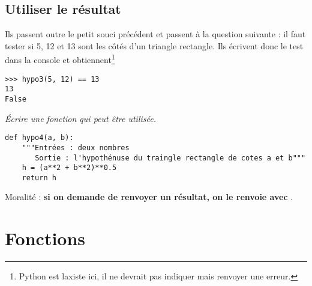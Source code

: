 \subsection{Utiliser le résultat} 
Ils passent outre le petit souci précédent et passent à la question suivante : il faut tester si 5, 12 et 13 sont les côtés d'un triangle rectangle. Ils écrivent donc le test dans la console et obtiennent\footnote{Python est laxiste ici, il ne devrait pas indiquer  mais renvoyer une erreur.}
\begin{lstlisting}
>>> hypo3(5, 12) == 13
13
False
\end{lstlisting}
\begin{Exercise}
\it Écrire une fonction  qui peut être utilisée.
\end{Exercise}
\begin{Answer}
\begin{lstlisting}
def hypo4(a, b):
    """Entrées : deux nombres
       Sortie : l'hypothénuse du traingle rectangle de cotes a et b"""
    h = (a**2 + b**2)**0.5
    return h
\end{lstlisting}
\end{Answer} 

\medskip

Moralité : {\bf si on demande de renvoyer un résultat, on le renvoie avec }.
\section{Fonctions} 

